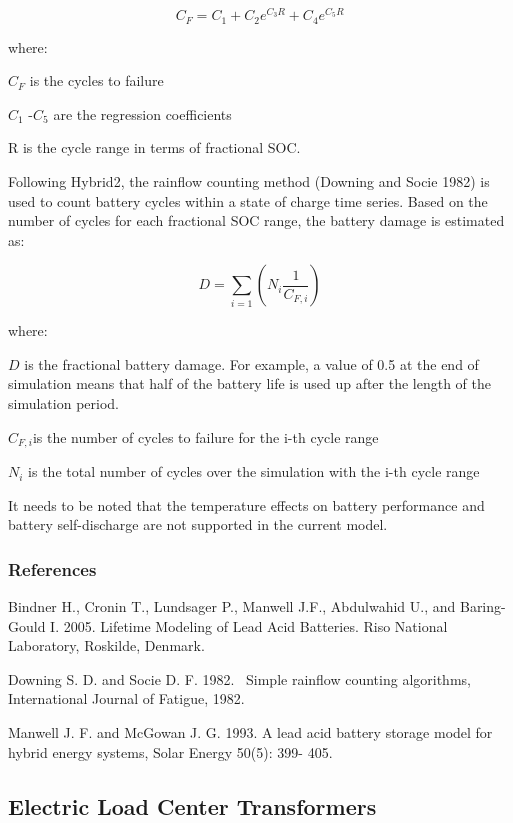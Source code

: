 \begin{equation}
{C_F} = {C_1} + {C_2}{e^{{C_3}R}} + {C_4}{e^{{C_5}R}}
\end{equation}

where:

\({C_F}\) is the cycles to failure

\({C_1}\) -\({C_5}\) are the regression coefficients

R is the cycle range in terms of fractional SOC.

Following Hybrid2, the rainflow counting method (Downing and Socie 1982) is used to count battery cycles within a state of charge time series. Based on the number of cycles for each fractional SOC range, the battery damage is estimated as:

\begin{equation}
D = \sum\limits_{i = 1}^{} {\left( {{N_i}\frac{1}{{{C_{F,i}}}}} \right)}
\end{equation}

where:

\(D\) is the fractional battery damage. For example, a value of 0.5 at the end of simulation means that half of the battery life is used up after the length of the simulation period.

\({C_{F,i}}\)is the number of cycles to failure for the i-th cycle range

\({N_i}\) is the total number of cycles over the simulation with the i-th cycle range

It needs to be noted that the temperature effects on battery performance and battery self-discharge are not supported in the current model.

\subsubsection{References}\label{references-021}

Bindner H., Cronin T., Lundsager P., Manwell J.F., Abdulwahid U., and Baring-Gould I. 2005. Lifetime Modeling of Lead Acid Batteries. Riso National Laboratory, Roskilde, Denmark.

Downing S. D. and Socie D. F. 1982.~ Simple rainflow counting algorithms, International Journal of Fatigue, 1982.

Manwell J. F. and McGowan J. G. 1993. A lead acid battery storage model for hybrid energy systems, Solar Energy 50(5): 399- 405.

\subsection{Electric Load Center Transformers}\label{electric-load-center-transformers}


